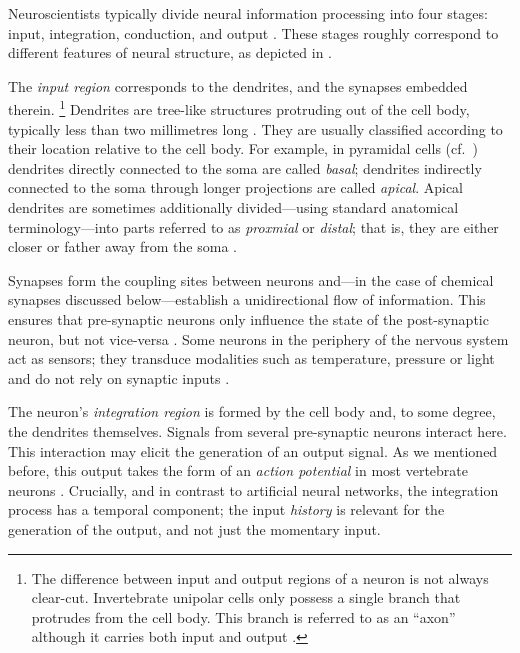 Neuroscientists typically divide neural information processing into four stages: input, integration, conduction, and output \citep[Chapter 2]{kandel2012principles}.
These stages roughly correspond to different features of neural structure, as depicted in .

The \emph{input region} corresponds to the dendrites, and the synapses embedded therein.%
\footnote{
The difference between input and output regions of a neuron is not always clear-cut.
Invertebrate unipolar cells only possess a single branch that protrudes from the cell body.
This branch is referred to as an \enquote{axon} although it carries both input and output \citep[Chapter~2]{kandel2012principles}.}
Dendrites are tree-like structures protruding out of the cell body, typically less than two millimetres long \citep[Chapter~1]{bear2016neuroscience}.
They are usually classified according to their location relative to the cell body.
For example, in pyramidal cells (cf.~) dendrites directly connected to the soma are called \emph{basal}; dendrites indirectly connected to the soma through longer projections are called \emph{apical}.
Apical dendrites are sometimes additionally divided---using standard anatomical terminology---into parts referred to as \emph{proxmial} or \emph{distal}; that is, they are either closer or father away from the soma \citep[e.g.,][Figure~5]{seamans1997contributions}.

Synapses form the coupling sites between neurons and---in the case of chemical synapses discussed below---establish a unidirectional flow of information.
This ensures that pre-synaptic neurons only influence the state of the post-synaptic neuron, but not vice-versa \citep[Chapter~8]{kandel2012principles}.
Some neurons in the periphery of the nervous system act as sensors; they transduce modalities such as temperature, pressure or light and do not rely on synaptic inputs \citep[Chapter~22]{kandel2012principles}.

The neuron's \emph{integration region} is formed by the cell body and, to some degree, the dendrites themselves.
Signals from several pre-synaptic neurons interact here.
This interaction may elicit the generation of an output signal.
As we mentioned before, this output takes the form of an \emph{action potential} in most vertebrate neurons \citep[Chapter~2]{kandel2012principles}.
Crucially, and in contrast to artificial neural networks, the integration process has a temporal component; the input \emph{history} is relevant for the generation of the output, and not just the momentary input.

